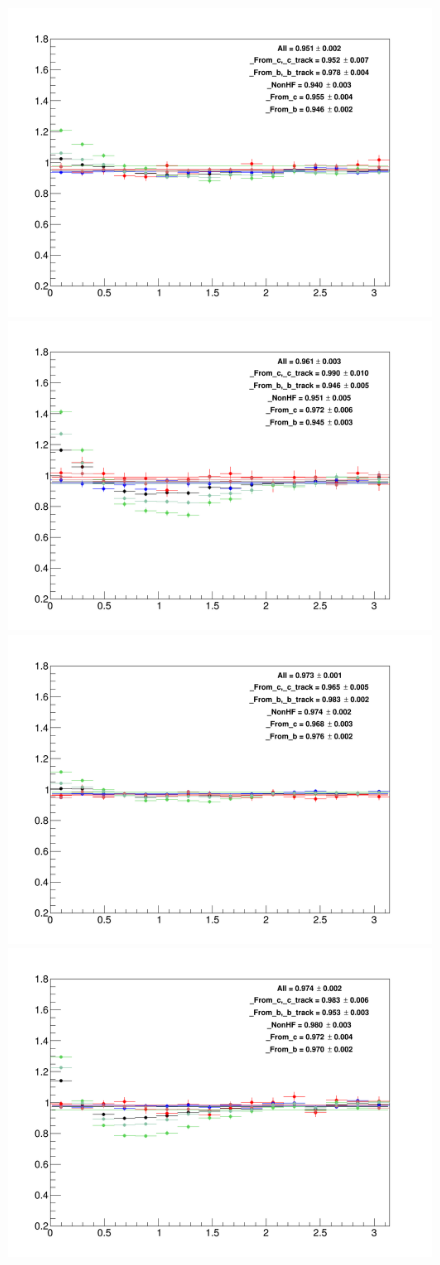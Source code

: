 \begin{figure}
\centering
{\includegraphics[width=.48\linewidth]{figures/MC_closure/MCClosure_Dzero_Canvas_PtIntBins3to3_PoolInt_thr03to1.png}}
{\includegraphics[width=.48\linewidth]{figures/MC_closure/MCClosure_Dzero_Canvas_PtIntBins3to3_PoolInt_thr1to99.png}} \\
{\includegraphics[width=.48\linewidth]{figures/MC_closure/MCClosure_Dzero_Canvas_PtIntBins4to5_PoolInt_thr03to1.png}}
{\includegraphics[width=.48\linewidth]{figures/MC_closure/MCClosure_Dzero_Canvas_PtIntBins4to5_PoolInt_thr1to99.png}} \\


\end{figure}
